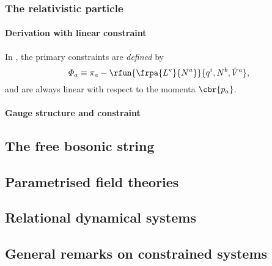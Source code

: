 \subsubsection{The relativistic particle}

\paragraph{Derivation with linear constraint}

In \cite{Gitman_1990}, the primary constraints are \emph{defined} by
\begin{equation}
\varPhi_a \equiv \pi_a - \rfun{\frpa{L^\text{v}}{N^a}}{q^i, N^b, \bar V^a},
\end{equation}
and are always linear with respect to the momenta $\cbr{p_a}$.

\paragraph{Gauge structure and constraint}

\subsection{The free bosonic string}

\subsection{Parametrised field theories}

\subsection{Relational dynamical systems}

\subsection{General remarks on constrained systems}